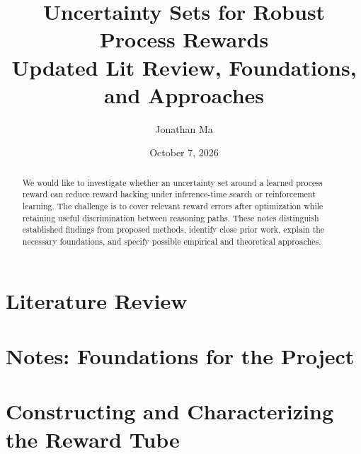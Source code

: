 \documentclass[11pt]{article}
\title{\textbf{Uncertainty Sets for Robust Process Rewards}\\
\large Updated Lit Review, Foundations, and Approaches}
\author{Jonathan Ma}
\date{October 7, 2026}
\begin{document}
\maketitle
\begin{abstract}
We would like to investigate whether an uncertainty set around a learned process reward
can reduce reward hacking under inference-time search or reinforcement learning.
The challenge is to cover relevant reward errors after optimization while
retaining useful discrimination between reasoning paths. These notes distinguish
established findings from proposed methods, identify close prior work, explain
the necessary foundations, and specify possible empirical and theoretical approaches.
\end{abstract}
\tableofcontents
\clearpage
\part{Literature Review}

\clearpage
\part{Notes: Foundations for the Project}

\clearpage
\part{Constructing and Characterizing the Reward Tube}

\clearpage
{}

\end{document}
